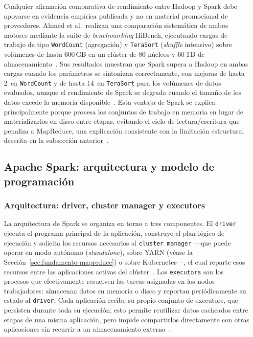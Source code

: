 \documentclass[11pt,a4paper]{article}
\begin{document}
Cualquier afirmación comparativa de rendimiento entre Hadoop y Spark
debe apoyarse en evidencia empírica publicada y no en material
promocional de proveedores. Ahmed et al.\ realizan una comparación
sistemática de ambos motores mediante la suite de \emph{benchmarking}
HiBench, ejecutando cargas de trabajo de tipo \texttt{WordCount}
(agregación) y \texttt{TeraSort} (\emph{shuffle} intensivo) sobre
volúmenes de hasta 600\,GB en un clúster de 80 núcleos y
60\,TB de almacenamiento~\autocite{ahmed2020}. Sus resultados muestran que
Spark supera a Hadoop en ambas cargas cuando los parámetros se
sintonizan correctamente, con mejoras de hasta 2\texttimes\ en
\texttt{WordCount} y de hasta 14\texttimes\ en \texttt{TeraSort} para
los volúmenes de datos evaluados, aunque el rendimiento de Spark se
degrada cuando el tamaño de los datos excede la memoria
disponible~\autocite{ahmed2020}. Esta ventaja de Spark se explica
principalmente porque procesa los conjuntos de trabajo en memoria en
lugar de materializarlos en disco entre etapas, evitando el ciclo de
lectura/escritura que penaliza a MapReduce, una explicación consistente
con la limitación estructural descrita en la
subsección anterior~\autocite{ahmed2020,white2015}.


\subsection{Apache Spark: arquitectura y modelo de programación}
\label{sec:fundamento-spark}

\subsubsection{Arquitectura: driver, cluster manager y executors}

La arquitectura de Spark se organiza en torno a tres componentes. El
\texttt{driver} ejecuta el programa principal de la aplicación,
construye el plan lógico de ejecución y solicita los recursos
necesarios al \texttt{cluster manager} —que puede operar en modo
autónomo (\emph{standalone}), sobre YARN (véase la
Sección~\ref{sec:fundamento-mapreduce}) o sobre Kubernetes—, el cual reparte
esos recursos entre las aplicaciones activas del
clúster~\autocite{khuat2025,zaharia2010}. Los \texttt{executors} son los
procesos que efectivamente resuelven las tareas asignadas en los nodos
trabajadores: almacenan datos en memoria o disco y reportan
periódicamente su estado al \texttt{driver}. Cada aplicación recibe su
propio conjunto de executors, que persisten durante toda su ejecución;
esto permite reutilizar datos cacheados entre etapas de una misma
aplicación, pero impide compartirlos directamente con otras
aplicaciones sin recurrir a un almacenamiento
externo~\autocite{khuat2025,zaharia2010}.
\end{document}
